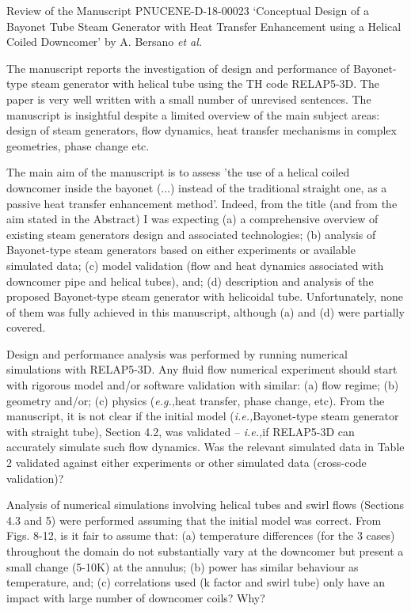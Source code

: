 \documentclass[14pt,twoside]{report}
\newcommand{\ie}{{\it i.e.,}}
\newcommand{\eg}{{\it e.g.,}}
\begin{document}
\clearpage



\begin{center}
  {\Large Review of the Manuscript PNUCENE-D-18-00023 `Conceptual Design of a Bayonet Tube Steam Generator with Heat Transfer Enhancement using a Helical Coiled Downcomer' by A. Bersano {\it et al.}}
\end{center}

\medskip
The manuscript reports the investigation of design and performance of Bayonet-type steam generator with helical tube using the TH code RELAP5-3D. The paper is very well written with a small number of unrevised sentences. The manuscript is insightful despite a limited overview of the main subject areas: design of steam generators, flow dynamics, heat transfer mechanisms in complex geometries, phase change etc.

The main aim of the manuscript is to assess 'the use of a helical coiled downcomer inside the bayonet (...) instead of the traditional straight one, as a passive heat transfer enhancement method'. Indeed, from the title (and from the aim stated in the Abstract) I was expecting (a) a comprehensive overview of existing steam generators design and associated technologies; (b) analysis of Bayonet-type steam generators based on either experiments or available simulated data; (c) model validation (flow and heat dynamics associated with downcomer pipe and helical tubes), and; (d) description and analysis of the proposed Bayonet-type steam generator with helicoidal tube. Unfortunately, none of them was fully achieved in this manuscript, although (a) and (d) were partially covered.

Design and performance analysis was performed by running numerical simulations with RELAP5-3D. Any fluid flow numerical experiment should start with rigorous model and/or software validation with similar: (a) flow regime; (b) geometry and/or; (c) physics (\eg heat transfer, phase change, etc). From the manuscript, it is not clear if the initial model (\ie Bayonet-type steam generator with straight tube), Section 4.2,  was validated -- \ie if RELAP5-3D can accurately simulate such flow dynamics. Was the relevant simulated data in Table 2 validated against either experiments or other simulated data (cross-code validation)?

Analysis of numerical simulations involving helical tubes and swirl flows (Sections 4.3 and 5) were performed assuming that the initial model was correct. From Figs. 8-12, is it fair to assume that: (a) temperature differences (for the 3 cases) throughout the domain do not substantially vary at the downcomer but present a small change (5-10K) at the annulus; (b) power has similar behaviour as temperature, and; (c) correlations used (k factor and swirl tube) only have an impact with large number of downcomer coils? Why?
\end{document}

